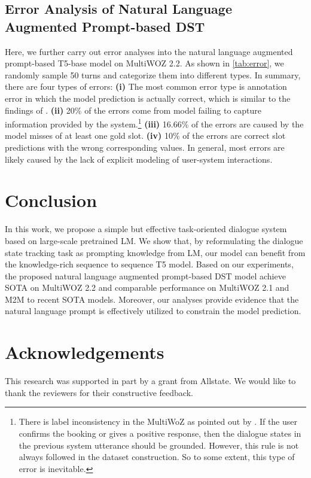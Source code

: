 \documentclass[11pt]{article}
\begin{document}
\subsection{Error Analysis of Natural Language Augmented Prompt-based DST}
Here, we further carry out error analyses into the natural language augmented prompt-based T5-base model on MultiWOZ 2.2. As shown in \autoref{tab:error}, we randomly sample 50 turns and categorize them into different types. In summary, there are four types of errors:
\textbf{(i)} The most common error type is annotation error in which the model prediction is actually correct, which is similar to the findings of \cite{zhou2019multi}. \textbf{(ii)} 20\% of the errors come from model failing to capture information provided by the system.\footnote{There is label inconsistency in the MultiWoZ as pointed out by \cite{zhou2019multi}. If the user confirms the booking or gives a positive response, then the dialogue states in the previous system utterance should be grounded. However, this rule is not always followed in the dataset construction. So to some extent, this type of error is inevitable.} \textbf{(iii)} 16.66\% of the errors are caused by the model misses of at least one gold slot. \textbf{(iv)} 10\% of the errors are correct slot predictions with the wrong corresponding values. In general, most errors are likely caused by the lack of explicit modeling of user-system interactions.

 
\section{Conclusion}
In this work, we propose a simple but effective task-oriented dialogue system based on large-scale pretrained LM. We show that, by reformulating the dialogue state tracking task as prompting knowledge from LM, our model can benefit from the knowledge-rich sequence to sequence T5 model. Based on our experiments, the proposed natural language augmented prompt-based DST model achieve SOTA on MultiWOZ 2.2 and comparable performance on MultiWOZ 2.1 and M2M to recent SOTA models. Moreover, our analyses provide evidence that the natural language prompt is effectively utilized to constrain the model prediction. 
\section*{Acknowledgements}
This research was supported in part by a grant from Allstate. We would like to thank the reviewers for their constructive feedback.


\end{document}
